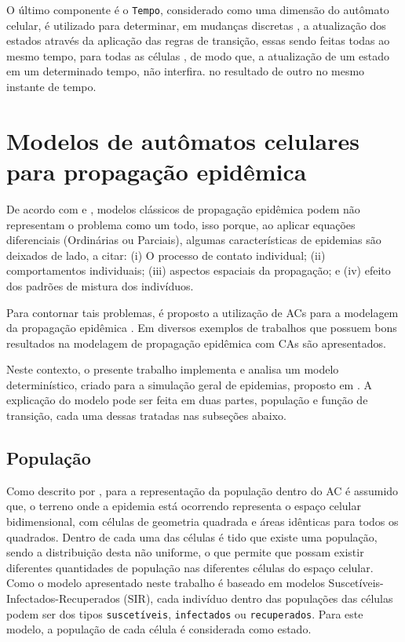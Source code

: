 \documentclass[
	11pt,				%
	openright,			%
	oneside,			%
	a4paper,			%
	english,			%
	french,				%
	spanish,			%
	brazil,				%
	]{abntex2}
\begin{document}
\par O último componente é o \texttt{Tempo}, considerado como uma dimensão do autômato celular, é utilizado para determinar, em mudanças discretas \cite{alexanderschatten2008}, a atualização dos estados através da aplicação das regras de transição, essas sendo feitas todas ao mesmo tempo, para todas as células \cite{Liu2008}, de modo que, a atualização de um estado em um determinado tempo, não interfira. no resultado de outro no mesmo instante de tempo.

\chapter{Modelos de autômatos celulares para propagação epidêmica}

\par De acordo com  e , modelos clássicos de propagação epidêmica podem não representam o problema como um todo, isso porque, ao aplicar equações diferenciais (Ordinárias ou Parciais), algumas características de epidemias são deixados de lado, a citar: (i) O processo de contato individual; (ii) comportamentos individuais; (iii) aspectos espaciais da propagação; e (iv) efeito dos padrões de mistura dos indivíduos.

\par Para contornar tais problemas, é proposto a utilização de ACs para a modelagem da propagação epidêmica \cite{White2007, Sirakoulis2000}. Em  diversos exemplos de trabalhos que possuem bons resultados na modelagem de propagação epidêmica com CAs são apresentados.

\par Neste contexto, o presente trabalho implementa e analisa um modelo determinístico, criado para a simulação geral de epidemias, proposto em \cite{White2007}. A explicação do modelo pode ser feita em duas partes, população e função de transição, cada uma dessas tratadas nas subseções abaixo.

\section{População}

\par Como descrito por , para a representação da população dentro do AC é assumido que, o terreno onde a epidemia está ocorrendo representa o espaço celular bidimensional, com células de geometria quadrada e áreas idênticas para todos os quadrados. Dentro de cada uma das células é tido que existe uma população, sendo a distribuição desta não uniforme, o que permite que possam existir diferentes quantidades de população nas diferentes células do espaço celular. Como o modelo apresentado neste trabalho é baseado em modelos Suscetíveis-Infectados-Recuperados (SIR), cada indivíduo dentro das populações das células podem ser dos tipos \texttt{suscetíveis}, \texttt{infectados} ou \texttt{recuperados}. Para este modelo, a população de cada célula é considerada como estado.
\end{document}
